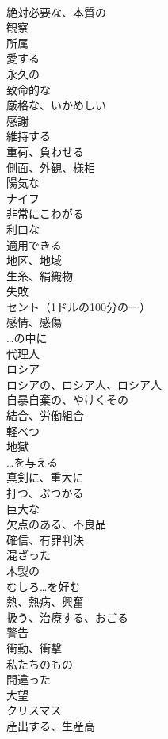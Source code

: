 \documentclass[8pt]{extreport}
\begin{document}
\begin{CJK}{UTF8}{min}
\\	絶対必要な、本質の	
\\	観察	
\\	所属	
\\	愛する	
\\	永久の	
\\	致命的な	
\\	厳格な、いかめしい	
\\	感謝	
\\	維持する	
\\	重荷、負わせる	
\\	側面、外観、様相	
\\	陽気な	
\\	ナイフ	
\\	非常にこわがる	
\\	利口な	
\\	適用できる	
\\	地区、地域	
\\	生糸、絹織物	
\\	失敗	
\\	セント（1ドルの100分の一）	
\\	感情、感傷	
\\	…の中に	
\\	代理人	
\\	ロシア	
\\	ロシアの、ロシア人、ロシア人	
\\	自暴自棄の、やけくその	
\\	結合、労働組合	
\\	軽べつ	
\\	地獄	
\\	…を与える	
\\	真剣に、重大に	
\\	打つ、ぶつかる	
\\	巨大な	
\\	欠点のある、不良品	
\\	確信、有罪判決	
\\	混ざった	
\\	木製の	
\\	むしろ…を好む	
\\	熱、熱病、興奮	
\\	扱う、治療する、おごる	
\\	警告	
\\	衝動、衝撃	
\\	私たちのもの	
\\	間違った	
\\	大望	
\\	クリスマス	
\\	産出する、生産高	

\end{CJK}
\end{document}
